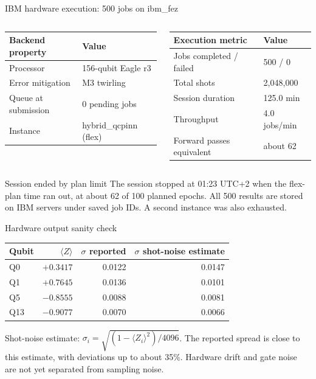 \documentclass[aspectratio=169]{beamer}
\begin{document}
\begin{frame}{IBM hardware execution: 500 jobs on ibm\_fez}
\begin{columns}[T,onlytextwidth]
\begin{center}
\small
\begin{tabular}{ll}
\toprule
Backend property & Value \\
\midrule
Processor & 156-qubit Eagle r3 \\
Error mitigation & M3 twirling \\
Queue at submission & 0 pending jobs \\
Instance & hybrid\_qcpinn (flex) \\
\bottomrule
\end{tabular}
\end{center}
\begin{center}
\small
\begin{tabular}{ll}
\toprule
Execution metric & Value \\
\midrule
Jobs completed / failed & 500 / 0 \\
Total shots & 2,048,000 \\
Session duration & 125.0 min \\
Throughput & 4.0 jobs/min \\
Forward passes equivalent & about 62 \\
\bottomrule
\end{tabular}
\end{center}
\end{columns}
\vspace{0.2cm}
\begin{alertblock}{Session ended by plan limit}
The session stopped at 01:23 UTC+2 when the flex-plan time ran out, at about 62 of 100 planned epochs. All 500 results are stored on IBM servers under saved job IDs. A second instance was also exhausted.
\end{alertblock}
\end{frame}

\begin{frame}{Hardware output sanity check}
\begin{center}
\small
\begin{tabular}{lrrr}
\toprule
Qubit & $\langle Z\rangle$ & $\sigma$ reported & $\sigma$ shot-noise estimate \\
\midrule
Q0  & $+0.3417$ & 0.0122 & 0.0147 \\
Q1  & $+0.7645$ & 0.0136 & 0.0101 \\
Q5  & $-0.8555$ & 0.0088 & 0.0081 \\
Q13 & $-0.9077$ & 0.0070 & 0.0066 \\
\bottomrule
\end{tabular}
\end{center}
\vspace{0.2cm}
Shot-noise estimate: $\sigma_i = \sqrt{(1-\langle Z_i\rangle^2)/4096}$. The reported spread is close to this estimate, with deviations up to about 35\%. Hardware drift and gate noise are not yet separated from sampling noise.
\end{frame}
\end{document}
